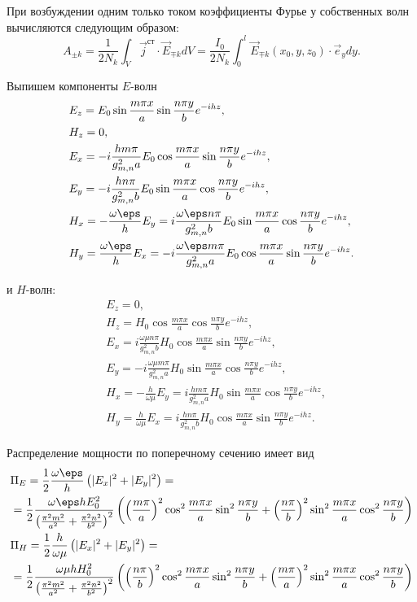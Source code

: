 \documentclass[a4paper,12pt]{extarticle}
\begin{document}
	При возбуждении одним только током коэффициенты Фурье у собственных волн вычисляются следующим образом:
	\[
		A_{\pm k} = \frac{1}{2N_k} \int_V \vec{j}^\text{ст}\cdot\vec{E}_{\mp k} dV = \frac{I_0}{2N_k} \int_0^l \vec{E}_{\mp k}(x_0,y,z_0)\cdot \vec{e}_y dy.
	\]

	Выпишем компоненты \( E \)-волн
	\begin{align*}
		& E_z = E_0\sin\frac{m\pi x}{a}\sin\frac{n\pi y}{b}e^{-ihz},\\
		& H_z = 0,\\
		& E_x = -i\frac{hm\pi}{g_{m,n}^2a}E_0\cos\frac{m\pi x}{a}\sin\frac{n\pi y}{b}e^{-ihz},\\
		& E_y = -i\frac{hn\pi}{g_{m,n}^2b}E_0\sin\frac{m\pi x}{a}\cos\frac{n\pi y}{b}e^{-ihz},\\
		& H_x = -\frac{\omega\eps}{h}E_y = i\frac{\omega\eps n\pi}{g_{m,n}^2b}E_0\sin\frac{m\pi x}{a}\cos\frac{n\pi y}{b}e^{-ihz},\\
		& H_y = \frac{\omega\eps}{h}E_x = -i\frac{\omega\eps m\pi}{g_{m,n}^2a}E_0\cos\frac{m\pi x}{a}\sin\frac{n\pi y}{b}e^{-ihz}.
	\end{align*}

	и \( H \)-волн:
	\begin{align*}
		& E_z = 0,\\
		& H_z = H_0\cos\frac{m\pi x}{a}\cos\frac{n\pi y}{b}e^{-ihz},\\
		& E_x = i\frac{\omega\mu n\pi}{g_{m,n}^2b}H_0\cos\frac{m\pi x}{a}\sin\frac{n\pi y}{b}e^{-ihz},\\
		& E_y = -i\frac{\omega\mu m\pi}{g_{m,n}^2a}H_0\sin\frac{m\pi x}{a}\cos\frac{n\pi y}{b}e^{-ihz},\\
		& H_x = -\frac{h}{\omega\mu}E_y = i\frac{hm\pi}{g_{m,n}^2a}H_0\sin\frac{m\pi x}{a}\cos\frac{n\pi y}{b}e^{-ihz},\\
		& H_y = \frac{h}{\omega\mu}E_x = i\frac{h n\pi}{g_{m,n}^2b}H_0\cos\frac{m\pi x}{a}\sin\frac{n\pi y}{b}e^{-ihz}.
	\end{align*}

	Распределение мощности по поперечному сечению имеет вид
	\begin{align*}
		& \Pi_E = \frac{1}{2}\frac{\omega\eps}{h}\left(|E_x|^2 + |E_y|^2\right) = \\
		& = \frac{1}{2}\frac{\omega\eps h E_0^2}{\left(\frac{\pi^2m^2}{a^2} + \frac{\pi^2n^2}{b^2}\right)^2}\left( \left(\frac{m\pi}{a}\right)^2\cos^2\frac{m\pi x}{a}\sin^2\frac{n\pi y}{b} + \left(\frac{n\pi}{b}\right)^2\sin^2\frac{m\pi x}{a}\cos^2\frac{n\pi y}{b} \right) \\
		& \Pi_H = \frac{1}{2}\frac{h}{\omega\mu}\left(|E_x|^2 + |E_y|^2\right) = \\
		& = \frac{1}{2}\frac{\omega\mu h H_0^2}{\left(\frac{\pi^2m^2}{a^2} + \frac{\pi^2n^2}{b^2}\right)^2}\left( \left(\frac{n\pi}{b}\right)^2\cos^2\frac{m\pi x}{a}\sin^2\frac{n\pi y}{b} + \left(\frac{m\pi}{a}\right)^2\sin^2\frac{m\pi x}{a}\cos^2\frac{n\pi y}{b} \right)
	\end{align*}
\end{document}
